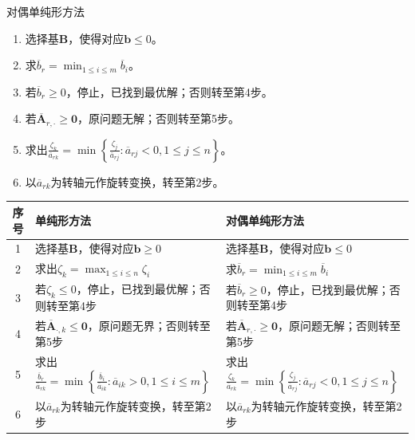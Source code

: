 \documentclass[lang = cn, scheme = chinese, thmcnt = section]{elegantbook}
\newcommand{\bs}{\boldsymbol}          %
\begin{document}
\begin{theorem}{对偶单纯形方法}
	\begin{enumerate}
		\item 选择基$\bs{B}$，使得对应$\bs{b}\le 0$。
		\item 求$\displaystyle \overline{b}_r=\min_{1\le i \le m}\overline{b}_i$。
		\item 若$\overline{b}_r\ge 0$，停止，已找到最优解；否则转至第4步。
		\item 若$\overline{\bs{A}}_{r,\cdot}\ge\bs{0}$，原问题无解；否则转至第5步。
		\item 求出$\displaystyle \frac{\zeta_k}{\overline{a}_{rk}}=\min\left\{ \frac{\zeta_j}{\overline{a}_{rj}}:\overline{a}_{rj}<0,1\le j \le n \right\}$。
		\item 以$\overline{a}_{rk}$为转轴元作旋转变换，转至第2步。
	\end{enumerate}
\end{theorem}

\begin{table}[H]
	\centering
	\begin{tabular}{cll}
		\toprule
		\textbf{序号} & \textbf{单纯形方法} & \textbf{对偶单纯形方法} \\
		\midrule
		1 & 选择基$\bs{B}$，使得对应$\bs{b}\ge 0$ & 选择基$\bs{B}$，使得对应$\bs{b}\le 0$ \\
		2 & 求出$\displaystyle \zeta_k=\max_{1\le i \le n}\zeta_i$ & 求$\displaystyle \overline{b}_r=\min_{1\le i \le m}\overline{b}_i$\\
		3 & 若$\zeta_k\le 0$，停止，已找到最优解；否则转至第4步 & 若$\overline{b}_r\ge 0$，停止，已找到最优解；否则转至第4步 \\
		4 & 若$\overline{\bs{A}}_{\cdot,k}\le\bs{0}$，原问题无界；否则转至第5步 & 若$\overline{\bs{A}}_{r,\cdot}\ge\bs{0}$，原问题无解；否则转至第5步 \\
		5 & 求出$\displaystyle \frac{\overline{b}_r}{\overline{a}_{rk}}=\min\left\{ \frac{\overline{b}_i}{\overline{a}_{ik}}:\overline{a}_{ik}>0,1\le i \le m \right\}$ & 求出$\displaystyle \frac{\zeta_k}{\overline{a}_{rk}}=\min\left\{ \frac{\zeta_j}{\overline{a}_{rj}}:\overline{a}_{rj}<0,1\le j \le n \right\}$ \\
		6 & 以$\overline{a}_{rk}$为转轴元作旋转变换，转至第2步 & 以$\overline{a}_{rk}$为转轴元作旋转变换，转至第2步 \\
		\bottomrule
	\end{tabular}
\end{table}
\end{document}
